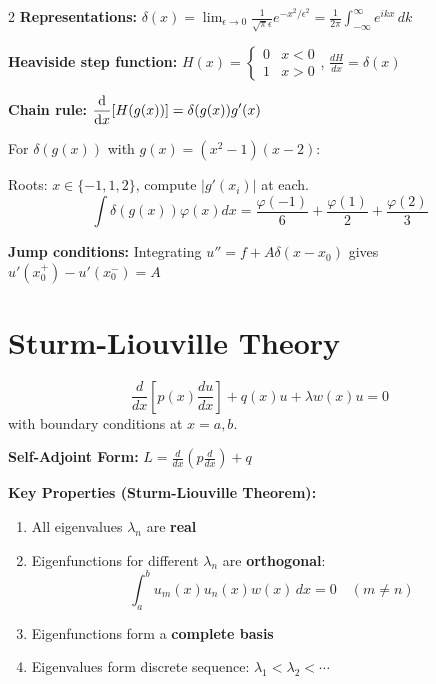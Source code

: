 \documentclass[10pt,a4paper]{article}
\begin{document}
\begin{multicols}{2}
\textbf{Representations:}
$\displaystyle\delta(x) = \lim_{\epsilon\to 0}\frac{1}{\sqrt{\pi}\epsilon}e^{-x^2/\epsilon^2} = \frac{1}{2\pi}\int_{-\infty}^{\infty}e^{ikx}\,dk$

\textbf{Heaviside step function:}
$H(x) = \begin{cases} 0 & x<0 \\ 1 & x>0 \end{cases}$, \quad $\displaystyle\frac{dH}{dx} = \delta(x)$

\textbf{Chain rule:} $\displaystyle\dv{x}[H(g(x))] = \delta(g(x))g'(x)$

\begin{example}
For $\delta(g(x))$ with $g(x) = (x^2-1)(x-2)$:

Roots: $x \in \{-1, 1, 2\}$, compute $|g'(x_i)|$ at each.
\begin{equation}
\int\delta(g(x))\varphi(x)dx = \frac{\varphi(-1)}{6} + \frac{\varphi(1)}{2} + \frac{\varphi(2)}{3}
\end{equation}
\end{example}

\textbf{Jump conditions:} Integrating $u'' = f + A\delta(x-x_0)$ gives
$u'(x_0^+) - u'(x_0^-) = A$

\section{Sturm-Liouville Theory}

\begin{keyformula}
\begin{equation}
\frac{d}{dx}\left[p(x)\frac{du}{dx}\right] + q(x)u + \lambda w(x)u = 0
\end{equation}
with boundary conditions at $x=a,b$.
\end{keyformula}

\textbf{Self-Adjoint Form:} $L = \frac{d}{dx}\left(p\frac{d}{dx}\right) + q$

\textbf{Key Properties (Sturm-Liouville Theorem):}
\begin{enumerate}
    \item All eigenvalues $\lambda_n$ are \textbf{real}
    \item Eigenfunctions for different $\lambda_n$ are \textbf{orthogonal}:
    \begin{equation}
    \int_a^b u_m(x)u_n(x)w(x)\,dx = 0 \quad (m \neq n)
    \end{equation}
    \item Eigenfunctions form a \textbf{complete basis}
    \item Eigenvalues form discrete sequence: $\lambda_1 < \lambda_2 < \cdots$
\end{enumerate}


\end{multicols}
\end{document}
